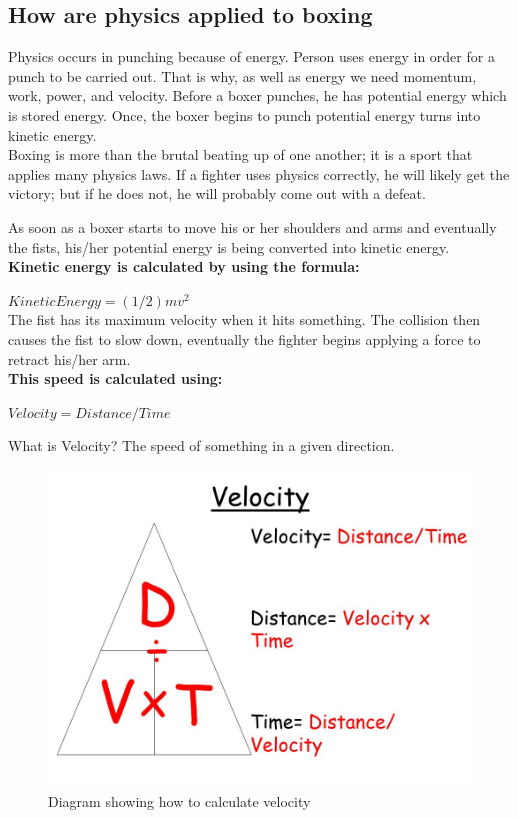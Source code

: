 \documentclass[a4paper,12pt]{report}
\begin{document}
\subsection{How are physics applied to boxing}
Physics occurs in punching because of energy. Person uses energy in order for a punch to be carried out. That is why, as well as energy we need momentum, work, power, and velocity. Before a boxer punches, he has potential energy which is stored energy. Once, the boxer begins to punch potential energy turns into kinetic energy.\\
Boxing is more than the brutal beating up of one another; it is a sport that applies many physics laws. If a fighter uses physics correctly, he will likely get the victory; but if he does not, he will probably come out with a defeat.

As soon as a boxer starts to move his or her shoulders and arms and eventually the fists, his/her potential energy is being converted into kinetic energy.\\

\textbf{Kinetic energy is calculated by using the formula:}

$Kinetic Energy = (1/2)mv^2$\\

The fist has its maximum velocity when it hits something. The collision then causes the fist to slow down, eventually the fighter begins applying a force to retract his/her arm.\\

\textbf{This speed is calculated using:}

$Velocity = Distance / Time$

What is Velocity? The speed of something in a given direction.\cite{boxPhysics}

 \begin{figure}[h]
    \begin{center}
    \includegraphics[scale=.3]{images/Velocity.jpeg}
    \caption{Diagram showing how to calculate velocity}
    \label{fig:velocity}
    \end{center}
\end{figure}
\end{document}
